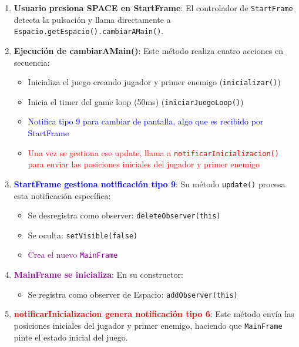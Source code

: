\documentclass[12pt, a4paper]{article}
\begin{document}
\begin{enumerate}[leftmargin=2em]
    \item \textbf{Usuario presiona SPACE en StartFrame}: El controlador de \texttt{StartFrame} detecta la pulsación y llama directamente a \lstinline|Espacio.getEspacio().cambiarAMain()|.
    
    \item \textbf{Ejecución de cambiarAMain()}: Este método realiza cuatro acciones en secuencia:
    \begin{itemize}[leftmargin=2em]
        \item Inicializa el juego creando jugador y primer enemigo (\lstinline|inicializar()|)
        \item Inicia el timer del game loop (50ms) (\lstinline|iniciarJuegoLoop()|)
        \item \textcolor{blue}{Notifica tipo 9 para cambiar de pantalla, algo que es recibido por StartFrame}
        \item \textcolor{red}{Una vez se gestiona ese update, llama a \lstinline|notificarInicializacion()| para enviar las posiciones iniciales del jugador y primer enemigo}
    \end{itemize}
    
    \item \textcolor{blue}{\textbf{StartFrame gestiona notificación tipo 9}}: Su método \lstinline|update()| procesa esta notificación específica:
    \begin{itemize}[leftmargin=2em]
        \item Se desregistra como observer: \lstinline|deleteObserver(this)|
        \item Se oculta: \lstinline|setVisible(false)|
        \item \textcolor{purple}{Crea el nuevo \texttt{MainFrame}}
    \end{itemize}
    
    \item \textcolor{purple}{\textbf{MainFrame se inicializa}}: En su constructor:
    \begin{itemize}[leftmargin=2em]
        \item Se registra como observer de Espacio: \lstinline|addObserver(this)|
    \end{itemize}
    
    \item \textcolor{red}{\textbf{notificarInicializacion genera notificación tipo 6}}: Este método envía las posiciones iniciales del jugador y primer enemigo, haciendo que \texttt{MainFrame} pinte el estado inicial del juego.
\end{enumerate}
\end{document}
